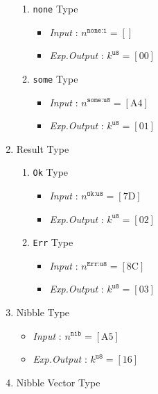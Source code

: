 \documentclass[../alan-handbook.tex]{subfiles}
\begin{document}
\begin{enumerate}
        \begin{enumerate}
            \item \texttt{none} Type 
                \begin{itemize}
                    \item \textit{Input} : $n^{\texttt{none:i}} = [  ] $
                    \item \textit{Exp.Output} : $k^{\texttt{u8}} = [\text{00}]$
                \end{itemize}
            \item \texttt{some} Type
                \begin{itemize}
                    \item \textit{Input} : $n^{\texttt{some:u8}} = [\text{A4}] $
                    \item \textit{Exp.Output} : $k^{\texttt{u8}} = [\text{01}]$
                \end{itemize}
        \end{enumerate}
    \item Result Type
        \begin{enumerate}
            \item \texttt{Ok} Type 
                \begin{itemize}
                    \item \textit{Input} : $n^{\texttt{Ok:u8}} = [\text{7D}] $
                    \item \textit{Exp.Output} : $k^{\texttt{u8}} = [\text{02}]$
                \end{itemize}
            \item \texttt{Err} Type
                \begin{itemize}
                    \item \textit{Input} : $n^{\texttt{Err:u8}} = [\text{8C}] $
                    \item \textit{Exp.Output} : $k^{\texttt{u8}} = [\text{03}]$
                \end{itemize}
        \end{enumerate}
    \item Nibble Type
        \begin{itemize}
            \item \textit{Input} : $n^{\texttt{nib}} = [\text{A5}] $
            \item \textit{Exp.Output} : $k^{\texttt{u8}} = [\text{16}]$
        \end{itemize}
    \item Nibble Vector Type

\end{enumerate}
\end{document}

